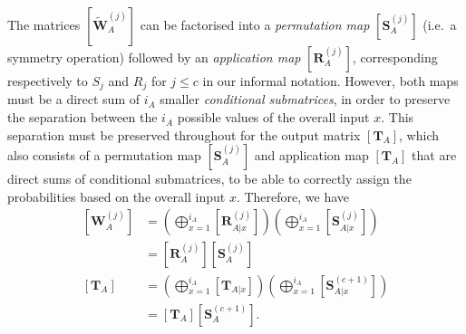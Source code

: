 \documentclass[10pt, a4paper]{article}
\numberwithin{equation}{section} %
\theoremstyle{definition}
\theoremstyle{plain}
\newcommand{\?}{\mathrel{?}} %
\newcommand{\matr}[2][]{\left[\mathbf{#2}#1\right]} %
\begin{document}
              The matrices \(\matr[_A^{(j)}]{\tilde{W}}\) can be factorised into a \emph{permutation map} \(\matr[_A^{(j)}]{S}\) (i.e.\ a symmetry operation) followed by an \emph{application map} \(\matr[_A^{(j)}]{R}\), corresponding respectively to \(S_j\) and \(R_j\) for \(j \leq c\) in our informal notation. However, both maps must be a direct sum of \(i_A\) smaller \emph{conditional submatrices}, in order to preserve the separation between the \(i_A\) possible values of the overall input \(x\). This separation must be preserved throughout for the output matrix \(\matr[_A]{T}\), which also consists of a permutation map \(\matr[_A^{(j)}]{S}\) and application map \(\matr[_A]{T}\) that are direct sums of conditional submatrices, to be able to correctly assign the probabilities based on the overall input \(x\). Therefore, we have
              \begin{align}
                \matr[_A^{(j)}]{W} &= \left( \bigoplus_{x=1}^{i_A} \matr[_{A|x}^{(j)}]{R} \right) \left( \bigoplus_{x=1}^{i_A} \matr[_{A|x}^{(j)}]{S} \right) \\
                                   &= \matr[_{A}^{(j)}]{R} \matr[_{A}^{(j)}]{S} \\
                \matr[_A]{T} &= \left( \bigoplus_{x=1}^{i_A} \matr[_{A|x}]{T} \right) \left( \bigoplus_{x=1}^{i_A} \matr[_{A|x}^{(c+1)}]{S} \right) \\
                             &= \matr[_{A}]{T} \matr[_{A}^{(c+1)}]{S}.
              \end{align}
\end{document}
